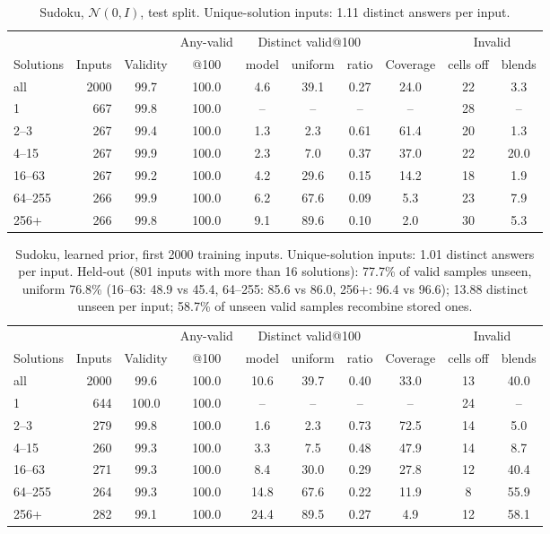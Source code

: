 \documentclass[11pt]{article}
\begin{document}
\begin{table}[H]
\centering\small
\begin{tabular}{@{}lrcccccccc@{}}
\toprule
& & & Any-valid & \multicolumn{3}{c}{Distinct valid@100} & & \multicolumn{2}{c}{Invalid} \\
\cmidrule(lr){5-7}\cmidrule(l){9-10}
Solutions & Inputs & Validity & @100 & model & uniform & ratio & Coverage & cells off & blends \\
\midrule
all & 2000 & 99.7 & 100.0 & 4.6 & 39.1 & 0.27 & 24.0 & 22 & 3.3 \\
1 & 667 & 99.8 & 100.0 & -- & -- & -- & -- & 28 & -- \\
2--3 & 267 & 99.4 & 100.0 & 1.3 & 2.3 & 0.61 & 61.4 & 20 & 1.3 \\
4--15 & 267 & 99.9 & 100.0 & 2.3 & 7.0 & 0.37 & 37.0 & 22 & 20.0 \\
16--63 & 267 & 99.2 & 100.0 & 4.2 & 29.6 & 0.15 & 14.2 & 18 & 1.9 \\
64--255 & 266 & 99.9 & 100.0 & 6.2 & 67.6 & 0.09 & 5.3 & 23 & 7.9 \\
256+ & 266 & 99.8 & 100.0 & 9.1 & 89.6 & 0.10 & 2.0 & 30 & 5.3 \\
\bottomrule
\end{tabular}
\caption{Sudoku, $\mathcal{N}(0,I)$, test split. Unique-solution inputs: 1.11 distinct answers per input.}
\end{table}

\begin{table}[H]
\centering\small
\begin{tabular}{@{}lrcccccccc@{}}
\toprule
& & & Any-valid & \multicolumn{3}{c}{Distinct valid@100} & & \multicolumn{2}{c}{Invalid} \\
\cmidrule(lr){5-7}\cmidrule(l){9-10}
Solutions & Inputs & Validity & @100 & model & uniform & ratio & Coverage & cells off & blends \\
\midrule
all & 2000 & 99.6 & 100.0 & 10.6 & 39.7 & 0.40 & 33.0 & 13 & 40.0 \\
1 & 644 & 100.0 & 100.0 & -- & -- & -- & -- & 24 & -- \\
2--3 & 279 & 99.8 & 100.0 & 1.6 & 2.3 & 0.73 & 72.5 & 14 & 5.0 \\
4--15 & 260 & 99.3 & 100.0 & 3.3 & 7.5 & 0.48 & 47.9 & 14 & 8.7 \\
16--63 & 271 & 99.3 & 100.0 & 8.4 & 30.0 & 0.29 & 27.8 & 12 & 40.4 \\
64--255 & 264 & 99.3 & 100.0 & 14.8 & 67.6 & 0.22 & 11.9 & 8 & 55.9 \\
256+ & 282 & 99.1 & 100.0 & 24.4 & 89.5 & 0.27 & 4.9 & 12 & 58.1 \\
\bottomrule
\end{tabular}
\caption{Sudoku, learned prior, first 2000 training inputs. Unique-solution inputs: 1.01 distinct answers per input. Held-out (801 inputs with more than 16 solutions): 77.7\% of valid samples unseen, uniform 76.8\% (16--63: 48.9 vs 45.4, 64--255: 85.6 vs 86.0, 256+: 96.4 vs 96.6); 13.88 distinct unseen per input; 58.7\% of unseen valid samples recombine stored ones.}
\end{table}
\end{document}
